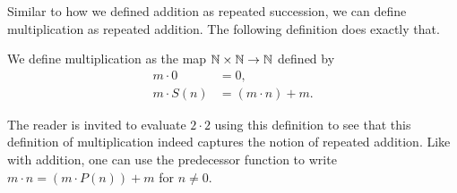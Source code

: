 \documentclass[../main.tex]{subfiles}
\begin{document}
Similar to how we defined addition as repeated succession, we can define multiplication as repeated addition. The following definition does exactly that.
\begin{definition}
    We define multiplication as the map $\mathbb{N}\times\mathbb{N}\to\mathbb{N}$ defined by
    \begin{align*}
        m\cdot0 & =0, \\
        m\cdot S(n) & =(m\cdot n)+m.
    \end{align*}
\end{definition}
The reader is invited to evaluate $2\cdot2$ using this definition to see that this definition of multiplication indeed captures the notion of repeated addition. Like with addition, one can use the predecessor function to write $m\cdot n=(m\cdot P(n))+m$ for $n\neq0$.
\end{document}
